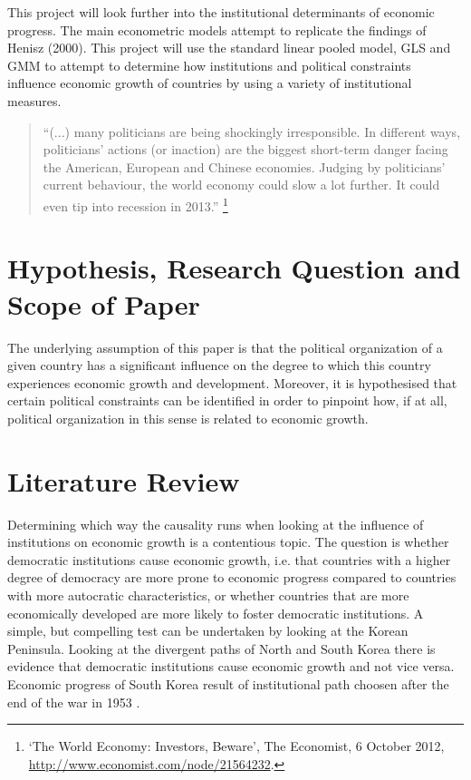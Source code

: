 \documentclass{article}\usepackage{graphicx, color}
\begin{document}
This project will look further into the institutional determinants
of economic progress. The main econometric models attempt to replicate
the findings of Henisz (2000). This project will use the standard
linear pooled model, GLS and GMM to attempt to determine how institutions
and political constraints influence economic growth of countries by
using a variety of institutional measures.
\begin{quote}
\textquotedblleft{}(...) many politicians are being shockingly irresponsible.
In different ways, politicians\textquoteright{} actions (or inaction)
are the biggest short-term danger facing the American, European and
Chinese economies. Judging by politicians\textquoteright{} current
behaviour, the world economy could slow a lot further. It could even
tip into recession in 2013.\textquotedblright{}%
\footnote{\textquoteleft{}The World Economy: Investors, Beware\textquoteright{},
The Economist, 6 October 2012, \href{http://www.economist.com/node/21564232}{http://www.economist.com/node/21564232}. %
}
\end{quote}

\section{Hypothesis, Research Question and Scope of Paper}

The underlying assumption of this paper is that the political organization
of a given country has a significant influence on the degree to which
this country experiences economic growth and development. Moreover,
it is hypothesised that certain political constraints can be identified
in order to pinpoint how, if at all, political organization in this
sense is related to economic growth.


\section{Literature Review}

Determining which way the causality runs when looking at the influence
of institutions on economic growth is a contentious topic. The question
is whether democratic institutions cause economic growth, i.e. that
countries with a higher degree of democracy are more prone to economic
progress compared to countries with more autocratic characteristics,
or whether countries that are more economically developed are more
likely to foster democratic institutions. A simple, but compelling
test can be undertaken by looking at the Korean Peninsula. Looking
at the divergent paths of North and South Korea there is evidence
that democratic institutions cause economic growth and not vice versa.
Economic progress of South Korea result of institutional path choosen
after the end of the war in 1953 \citep[p. 272]{glaeser2004doinstitutions}.
\end{document}
